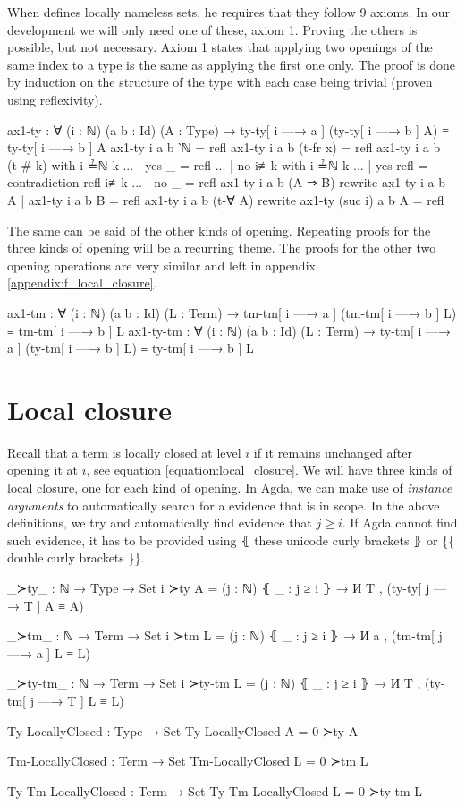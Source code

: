 \documentclass[logo,bsc,singlespacing,parskip,online]{infthesis}
\begin{document}
When \citet{pitts_locally_2023} defines locally nameless sets, he requires that they follow 9
axioms. In our development we will only need one of these, axiom 1. Proving the others is possible,
but not necessary. Axiom 1 states that applying two openings of the same index to a type is the same
as applying the first one only. The proof is done by induction on the structure of the type with
each case being trivial (proven using reflexivity).
\begin{code}
  ax1-ty : ∀ (i : ℕ) (a b : Id) (A : Type)
    → ty-ty[ i —→ a ] (ty-ty[ i —→ b ] A) ≡ ty-ty[ i —→ b ] A
  ax1-ty i a b ‵ℕ = refl
  ax1-ty i a b (t-fr x) = refl
  ax1-ty i a b (t-# k) with i ≟ℕ k
  ... | yes _   = refl
  ... | no  i≢k with i ≟ℕ k
  ...   | yes refl = contradiction refl i≢k
  ...   | no  _    = refl
  ax1-ty i a b (A ⇒ B)
    rewrite ax1-ty i a b A | ax1-ty i a b B = refl
  ax1-ty i a b (t-∀ A) rewrite ax1-ty (suc i) a b A = refl
\end{code}

The same can be said of the other kinds of opening. Repeating proofs for the three kinds of opening
will be a recurring theme. The proofs for the other two opening operations are very similar and left
in appendix \ref{appendix:f_local_closure}.
\begin{code}
  ax1-tm : ∀ (i : ℕ) (a b : Id) (L : Term)
    → tm-tm[ i —→ a ] (tm-tm[ i —→ b ] L) ≡ tm-tm[ i —→ b ] L
  ax1-ty-tm : ∀ (i : ℕ) (a b : Id) (L : Term)
    → ty-tm[ i —→ a ] (ty-tm[ i —→ b ] L) ≡ ty-tm[ i —→ b ] L
\end{code}

\section{Local closure}
\label{chapter3:local_closure}
Recall that a term is locally closed at level $i$ if it remains unchanged after opening it at $i$,
see equation \ref{equation:local_closure}. We will have three kinds of local closure, one for each
kind of opening. In Agda, we can make use of \textit{instance arguments} to automatically search for
a evidence that is in scope. In the above definitions, we try and automatically find evidence that
$j \geq i$. If Agda cannot find such evidence, it has to be provided using ⦃ these unicode curly
brackets ⦄ or \{\{ double curly brackets \}\}.

\begin{code}
  _≻ty_ : ℕ → Type → Set
  i ≻ty A = (j : ℕ) ⦃ _ : j ≥ i ⦄ → И T , (ty-ty[ j —→ T ] A ≡ A)

  _≻tm_ : ℕ → Term → Set
  i ≻tm L = (j : ℕ) ⦃ _ : j ≥ i ⦄ → И a , (tm-tm[ j —→ a ] L ≡ L)

  _≻ty-tm_ : ℕ → Term → Set
  i ≻ty-tm L = (j : ℕ) ⦃ _ : j ≥ i ⦄ → И T , (ty-tm[ j —→ T ] L ≡ L)

  Ty-LocallyClosed : Type → Set
  Ty-LocallyClosed A = 0 ≻ty A

  Tm-LocallyClosed : Term → Set
  Tm-LocallyClosed L = 0 ≻tm L

  Ty-Tm-LocallyClosed : Term → Set
  Ty-Tm-LocallyClosed L = 0 ≻ty-tm L
\end{code}
\end{document}
